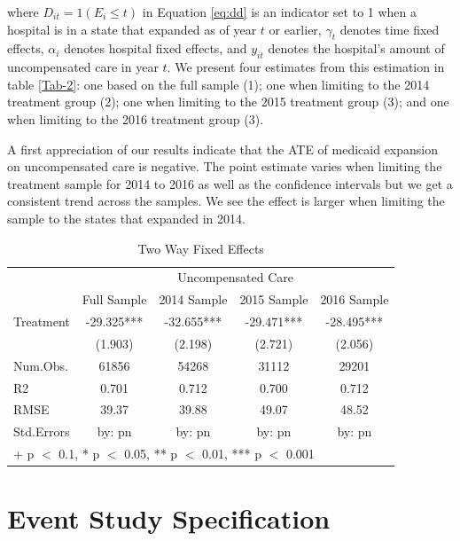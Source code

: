 \documentclass[
  12pt,
]{article}
\begin{document}
where \(D_{it}=1(E_{i}\leq t)\) in Equation \ref{eq:dd} is an indicator
set to 1 when a hospital is in a state that expanded as of year \(t\) or
earlier, \(\gamma_{t}\) denotes time fixed effects, \(\alpha_{i}\)
denotes hospital fixed effects, and \(y_{it}\) denotes the hospital's
amount of uncompensated care in year \(t\). We present four estimates
from this estimation in table \ref{Tab-2}: one based on the full sample
(1); one when limiting to the 2014 treatment group (2); one when
limiting to the 2015 treatment group (3); and one when limiting to the
2016 treatment group (3).

A first appreciation of our results indicate that the ATE of medicaid
expansion on uncompensated care is negative. The point estimate varies
when limiting the treatment sample for 2014 to 2016 as well as the
confidence intervals but we get a consistent trend across the samples.
We see the effect is larger when limiting the sample to the states that
expanded in 2014.

\begin{table}

\caption{\label{tab:Tab-2}Two Way Fixed Effects}
\centering
\begin{tabular}[t]{lcccc}
\toprule
\multicolumn{1}{c}{ } & \multicolumn{4}{c}{Uncompensated Care} \\
\cmidrule(l{3pt}r{3pt}){2-5}
  & Full Sample & 2014 Sample & 2015 Sample & 2016 Sample\\
\midrule
Treatment & -29.325*** & -32.655*** & -29.471*** & -28.495***\\
 & (1.903) & (2.198) & (2.721) & (2.056)\\
\midrule
Num.Obs. & 61856 & 54268 & 31112 & 29201\\
R2 & 0.701 & 0.712 & 0.700 & 0.712\\
RMSE & 39.37 & 39.88 & 49.07 & 48.52\\
Std.Errors & by: pn & by: pn & by: pn & by: pn\\
\bottomrule
\multicolumn{5}{l}{\rule{0pt}{1em}+ p $<$ 0.1, * p $<$ 0.05, ** p $<$ 0.01, *** p $<$ 0.001}\\
\end{tabular}
\end{table}

\newpage

\hypertarget{event-study-specification}{%
\section{Event Study Specification}\label{event-study-specification}}
\end{document}
